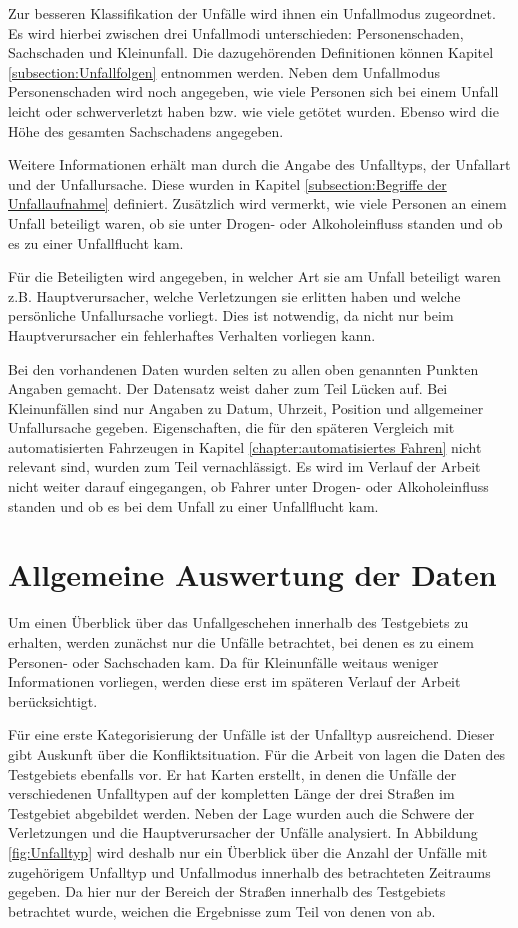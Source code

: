 Zur besseren Klassifikation der Unfälle wird ihnen ein Unfallmodus zugeordnet. Es wird hierbei zwischen drei Unfallmodi unterschieden: Personenschaden, Sachschaden und Kleinunfall. Die dazugehörenden Definitionen können Kapitel \ref{subsection:Unfallfolgen} entnommen werden. Neben dem Unfallmodus Personenschaden wird noch angegeben, wie viele Personen sich bei einem Unfall leicht oder schwerverletzt haben bzw. wie viele getötet wurden. Ebenso wird die Höhe des gesamten Sachschadens angegeben.

Weitere Informationen erhält man durch die Angabe des Unfalltyps, der Unfallart und der Unfallursache. Diese wurden in Kapitel \ref{subsection:Begriffe der Unfallaufnahme} definiert. Zusätzlich wird vermerkt, wie viele Personen an einem Unfall beteiligt waren, ob sie unter Drogen- oder Alkoholeinfluss standen und ob es zu einer Unfallflucht kam. 

Für die Beteiligten wird angegeben, in welcher Art sie am Unfall beteiligt waren z.B. Hauptverursacher, welche Verletzungen sie erlitten haben und welche persönliche Unfallursache vorliegt. Dies ist notwendig, da nicht nur beim Hauptverursacher ein fehlerhaftes Verhalten vorliegen kann.

Bei den vorhandenen Daten wurden selten zu allen oben genannten Punkten Angaben gemacht. Der Datensatz weist daher zum Teil Lücken auf. Bei Kleinunfällen sind nur Angaben zu Datum, Uhrzeit, Position und allgemeiner Unfallursache gegeben. Eigenschaften, die für den späteren Vergleich mit automatisierten Fahrzeugen in  Kapitel \ref{chapter:automatisiertes Fahren} nicht relevant sind, wurden zum Teil vernachlässigt. Es wird im Verlauf der Arbeit nicht weiter darauf eingegangen, ob Fahrer unter Drogen- oder Alkoholeinfluss standen und ob es bei dem Unfall zu einer Unfallflucht kam.

\section{Allgemeine Auswertung der Daten}
Um einen Überblick über das Unfallgeschehen innerhalb des Testgebiets zu erhalten, werden zunächst nur die Unfälle betrachtet, bei denen es zu einem Personen- oder Sachschaden kam. Da für Kleinunfälle weitaus weniger Informationen vorliegen, werden diese erst im späteren Verlauf der Arbeit berücksichtigt.

Für eine erste Kategorisierung der Unfälle ist der Unfalltyp ausreichend. Dieser gibt Auskunft über die Konfliktsituation. Für die Arbeit von \Textcite[S. 16-33]{Bruhn.2018} lagen die Daten des Testgebiets ebenfalls vor. Er hat Karten erstellt, in denen die Unfälle der verschiedenen Unfalltypen auf der kompletten Länge der drei Straßen im Testgebiet abgebildet werden. Neben der Lage wurden auch die Schwere der Verletzungen und die Hauptverursacher der Unfälle analysiert. In Abbildung \ref{fig:Unfalltyp} wird deshalb nur ein Überblick über die  Anzahl der Unfälle mit zugehörigem Unfalltyp und Unfallmodus innerhalb des betrachteten Zeitraums gegeben. Da hier nur der Bereich der Straßen innerhalb des Testgebiets betrachtet wurde, weichen die Ergebnisse zum Teil von denen von \Textcite[S. 16-33]{Bruhn.2018} ab. 

